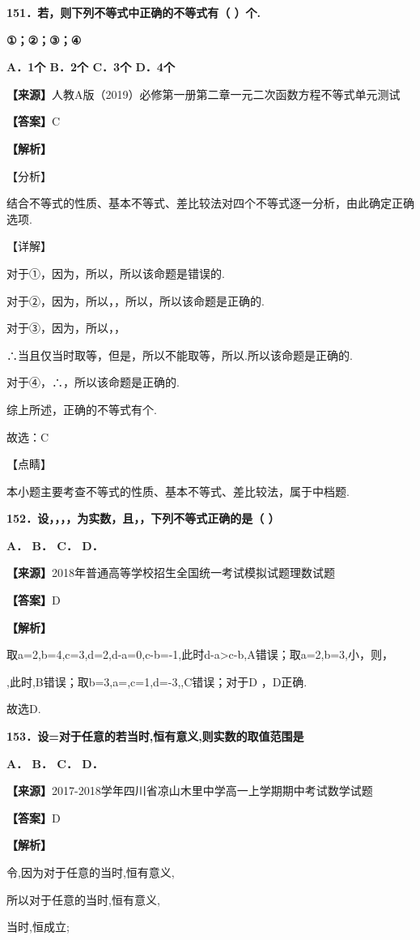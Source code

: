 \textbf{151．若，则下列不等式中正确的不等式有（ ）个.}

\textbf{①；②；③；④}

\textbf{A．1个 B．2个 C．3个 D．4个}

\textbf{【来源】}人教A版（2019）必修第一册第二章一元二次函数方程不等式单元测试

\textbf{【答案】}C

\textbf{【解析】}

【分析】

结合不等式的性质、基本不等式、差比较法对四个不等式逐一分析，由此确定正确选项.

【详解】

对于①，因为，所以，所以该命题是错误的.

对于②，因为，所以，，所以，所以该命题是正确的.

对于③，因为，所以，，

∴当且仅当时取等，但是，所以不能取等，所以.所以该命题是正确的.

对于④，∴，所以该命题是正确的.

综上所述，正确的不等式有个.

故选：C

【点睛】

本小题主要考查不等式的性质、基本不等式、差比较法，属于中档题.

\textbf{152．设，，，，为实数，且，，下列不等式正确的是（ ）}

\textbf{A． B． C． D．}

\textbf{【来源】}2018年普通高等学校招生全国统一考试模拟试题理数试题

\textbf{【答案】}D

\textbf{【解析】}

取a=2,b=4,c=3,d=2,d-a=0,c-b=-1,此时d-a\textgreater c-b,A错误；取a=2,b=3,小，则，

,此时,B错误；取b=3,a=,c=1,d=-3,,C错误；对于D ，D正确.

故选D.

\textbf{153．设=对于任意的若当时,恒有意义,则实数的取值范围是}

\textbf{A． B． C． D．}

\textbf{【来源】}2017-2018学年四川省凉山木里中学高一上学期期中考试数学试题

\textbf{【答案】}D

\textbf{【解析】}

令,因为对于任意的当时,恒有意义,

所以对于任意的当时,恒有意义,

当时,恒成立;

